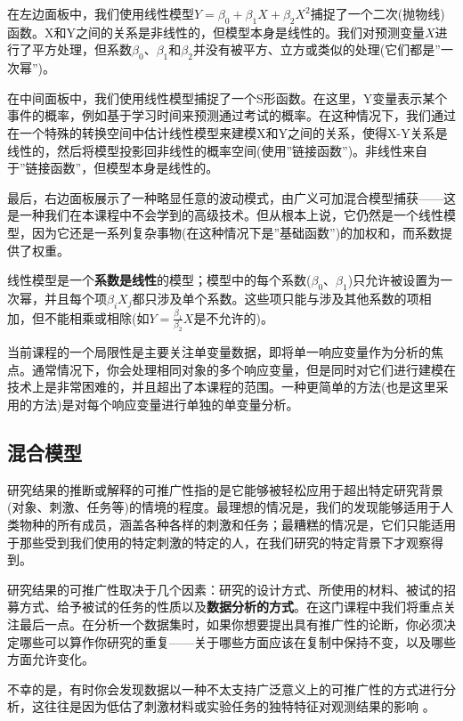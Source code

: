\documentclass[
]{book}
\begin{document}
在左边面板中，我们使用线性模型\(Y = \beta_0 + \beta_1 X + \beta_2 X^2\)捕捉了一个二次(抛物线)函数。X和Y之间的关系是非线性的，但模型本身是线性的。我们对预测变量\(X\)进行了平方处理，但系数\(\beta_0\)、\(\beta_1\)和\(\beta_2\)并没有被平方、立方或类似的处理(它们都是''一次幂'')。

在中间面板中，我们使用线性模型捕捉了一个S形函数。在这里，Y变量表示某个事件的概率，例如基于学习时间来预测通过考试的概率。在这种情况下，我们通过在一个特殊的转换空间中估计线性模型来建模X和Y之间的关系，使得X-Y关系是线性的，然后将模型投影回非线性的概率空间(使用''链接函数'')。非线性来自于''链接函数''，但模型本身是线性的。

最后，右边面板展示了一种略显任意的波动模式，由广义可加混合模型捕获------这是一种我们在本课程中不会学到的高级技术。但从根本上说，它仍然是一个线性模型，因为它还是一系列复杂事物(在这种情况下是''基础函数'')的加权和，而系数提供了权重。

线性模型是一个\textbf{系数是线性}的模型；模型中的每个系数(\(\beta_0\)、\(\beta_1\))只允许被设置为一次幂，并且每个项\(\beta_i X_j\)都只涉及单个系数。这些项只能与涉及其他系数的项相加，但不能相乘或相除(如\(Y = \frac{\beta_1}{\beta_2} X\)是不允许的)。

当前课程的一个局限性是主要关注单变量数据，即将单一响应变量作为分析的焦点。通常情况下，你会处理相同对象的多个响应变量，但是同时对它们进行建模在技术上是非常困难的，并且超出了本课程的范围。一种更简单的方法(也是这里采用的方法)是对每个响应变量进行单独的单变量分析。

\hypertarget{ux6df7ux5408ux6a21ux578b}{%
\subsection{混合模型}\label{ux6df7ux5408ux6a21ux578b}}

研究结果的推断或解释的可推广性指的是它能够被轻松应用于超出特定研究背景(对象、刺激、任务等)的情境的程度。最理想的情况是，我们的发现能够适用于人类物种的所有成员，涵盖各种各样的刺激和任务；最糟糕的情况是，它们只能适用于那些受到我们使用的特定刺激的特定的人，在我们研究的特定背景下才观察得到。

研究结果的可推广性取决于几个因素：研究的设计方式、所使用的材料、被试的招募方式、给予被试的任务的性质以及\textbf{数据分析的方式}。在这门课程中我们将重点关注最后一点。在分析一个数据集时，如果你想要提出具有推广性的论断，你必须决定哪些可以算作你研究的重复------关于哪些方面应该在复制中保持不变，以及哪些方面允许变化。

不幸的是，有时你会发现数据以一种不太支持广泛意义上的可推广性的方式进行分析，这往往是因为低估了刺激材料或实验任务的独特特征对观测结果的影响 \citep{yarkoni_2019}。
\end{document}
